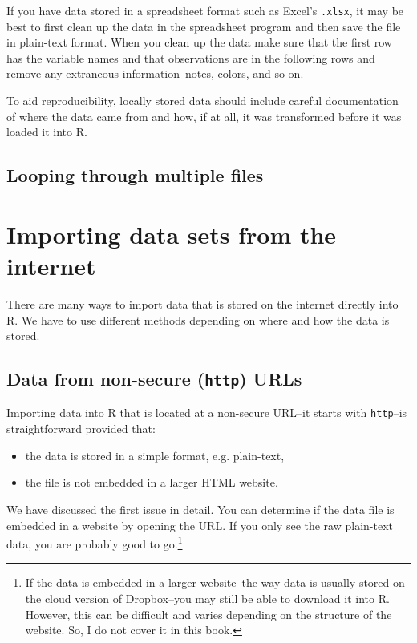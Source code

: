 If you have data stored in a spreadsheet format such as Excel's \texttt{.xlsx}, it may be best to first clean up the data in the spreadsheet program and then save the file in plain-text format. When you clean up the data make sure that the first row has the variable names and that observations are in the following rows and remove any extraneous information--notes, colors, and so on.

To aid reproducibility, locally stored data should include careful documentation of where the data came from and how, if at all, it was transformed before it was loaded it into R.

\subsection{Looping through multiple files}


\section{Importing data sets from the internet}

There are many ways to import data that is stored on the internet directly into R. We have to use different methods depending on where and how the data is stored. 

\subsection{Data from non-secure ({\tt{http}}) URLs}

Importing data into R that is located at a non-secure URL--it starts with {\tt{http}}--is straightforward provided that:

\begin{itemize}
    \item the data is stored in a simple format, e.g. plain-text,
    \item the file is not embedded in a larger HTML website.
\end{itemize}

We have discussed the first issue in detail. You can determine if the data file is embedded in a website by opening the URL. If you only see the raw plain-text data, you are probably good to go.\footnote{If the data is embedded in a larger website--the way data is usually stored on the cloud version of Dropbox--you may still be able to download it into R. However, this can be difficult and varies depending on the structure of the website. So, I do not cover it in this book.}

